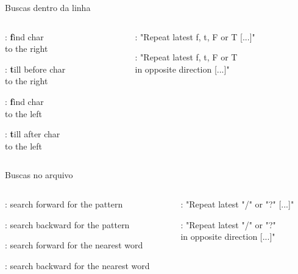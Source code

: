 \begin{frame}{Buscas dentro da linha}
    \begin{columns}
        \begin{column}{0.3\textwidth}
            \begin{widedescription}
            \item {}: \textbf{f}ind char \\ to the right
            \item {}: \textbf{t}ill before char \\ to the right
            \item {}: \textbf{f}ind char \\ to the left
            \item {}: \textbf{t}ill after char \\ to the left
            \end{widedescription}
        \end{column}

        \begin{column}{0.7\textwidth}
           \begin{widedescription}
               \item \key{;}: "Repeat latest f, t, F or T [...]"
               \item \key{,}: "Repeat latest f, t, F or T \\ in opposite direction [...]"
           \end{widedescription} 
        \end{column}
    \end{columns}
\end{frame}

\begin{frame}{Buscas no arquivo}
    \begin{columns}
        \begin{column}{0.4\textwidth}
            \begin{widedescription}
            \item \key{/}: search forward for the pattern
            \item {}: search backward for the pattern
            \item \key{*}: search forward for the nearest word
            \item \key{\#}: search backward for the nearest word
            \end{widedescription}
        \end{column}

        \begin{column}{0.6\textwidth}
           \begin{widedescription}
               \item {}: "Repeat latest "/" or "?" [...]"
               \item {}: "Repeat latest "/" or "?" \\ in opposite direction [...]"
           \end{widedescription} 
        \end{column}
    \end{columns}
\end{frame}

